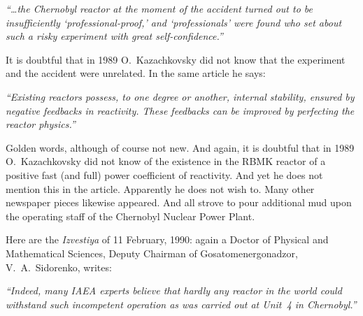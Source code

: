 \documentclass[openright]{bookest}
\begin{document}
\begin{personal}
\textit{``\ldots the Chernobyl reactor at the moment of the accident turned out to be insufficiently `professional-proof,' and `professionals' were found who set about such a risky experiment with great self-confidence.''}
\end{personal}

It is doubtful that in 1989 O.~Kazachkovsky did not know that the experiment and the accident were unrelated. In the same article he says:

\begin{personal}
\textit{``Existing reactors possess, to one degree or another, internal stability, ensured by negative feedbacks in reactivity. These feedbacks can be improved by perfecting the reactor physics.''}
\end{personal}

Golden words, although of course not new. And again, it is doubtful that in 1989 O.~Kazachkovsky did not know of the existence in the RBMK reactor of a positive fast (and full) power coefficient of reactivity. And yet he does not mention this in the article. Apparently he does not wish to. Many other newspaper pieces likewise appeared. And all strove to pour additional mud upon the operating staff of the Chernobyl Nuclear Power Plant.

Here are the \textit{Izvestiya} of 11 February, 1990: again a Doctor of Physical and Mathematical Sciences, Deputy Chairman of Gosatomenergonadzor, V.~A.~Sidorenko, writes:

\begin{personal}
\textit{``Indeed, many IAEA experts believe that hardly any reactor in the world could withstand such incompetent operation as was carried out at Unit~4 in Chernobyl.''}
\end{personal}
\end{document}
